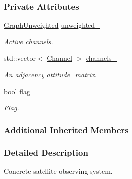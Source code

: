 \subsubsection*{Private Attributes}
\begin{DoxyCompactItemize}
\item 
\mbox{\label{classosse_1_1collaborate_1_1_observing_system_alpha_afb9f4173b5226b349365b7d529fa93e2}} 
\hyperlink{classosse_1_1collaborate_1_1_graph_unweighted}{Graph\+Unweighted} \hyperlink{classosse_1_1collaborate_1_1_observing_system_alpha_afb9f4173b5226b349365b7d529fa93e2}{unweighted\+\_\+}
\begin{DoxyCompactList}\small\item\em Active channels. \end{DoxyCompactList}\item 
\mbox{\label{classosse_1_1collaborate_1_1_observing_system_alpha_a69f8f791a0d6289f2d043a4a2ec6912c}} 
std\+::vector$<$ \hyperlink{classosse_1_1collaborate_1_1_channel}{Channel} $>$ \hyperlink{classosse_1_1collaborate_1_1_observing_system_alpha_a69f8f791a0d6289f2d043a4a2ec6912c}{channels\+\_\+}
\begin{DoxyCompactList}\small\item\em An adjacency attitude\+\_\+matrix. \end{DoxyCompactList}\item 
\mbox{\label{classosse_1_1collaborate_1_1_observing_system_alpha_a5aaa729d1e8c2778865626843035e510}} 
bool \hyperlink{classosse_1_1collaborate_1_1_observing_system_alpha_a5aaa729d1e8c2778865626843035e510}{flag\+\_\+}
\begin{DoxyCompactList}\small\item\em Flag. \end{DoxyCompactList}\end{DoxyCompactItemize}
\subsubsection*{Additional Inherited Members}


\subsubsection{Detailed Description}
Concrete satellite observing system. 

